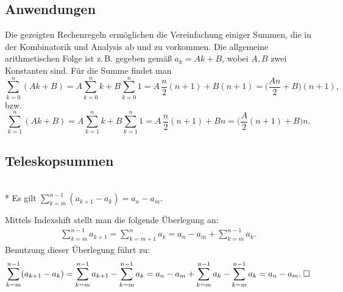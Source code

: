 \subsection{Anwendungen}

Die gezeigten Rechenregeln ermöglichen die Vereinfachung
einiger Summen, die in der Kombinatorik und Analysis ab
und zu vorkommen. Die allgemeine arithmetischen Folge ist z.\,B.
gegeben gemäß $a_k=Ak+B$, wobei $A,B$ zwei Konstanten sind.
Für die Summe findet man%
\[\sum_{k=0}^n (Ak+B)
= A\sum_{k=0}^n k+B\sum_{k=0}^n 1 = A\,\frac{n}{2}(n+1)+B(n+1)
= \Big(\frac{An}{2}+B\Big)(n+1),\]
bzw.
\[\sum_{k=1}^n (Ak+B)
= A\sum_{k=1}^n k + B\sum_{k=1}^n 1
= A\,\frac{n}{2}(n+1)+Bn = \Big(\frac{A}{2}(n+1)+B\Big)n.\]

\newpage
\subsection{Teleskopsummen}

\begin{Satz}[Teleskopsumme]\mbox{}\\*
Es gilt $\sum_{k=m}^{n-1} (a_{k+1}-a_k) = a_n-a_m$.
\end{Satz}
Mittels Indexshift stellt man die folgende Überlegung an:
\begin{gather*}
\sum_{k=m}^{n-1} a_{k+1}
= \sum_{k=m+1}^n a_k = a_n-a_m+\sum_{k=m}^{n-1} a_k.
\end{gather*}
Benutzung dieser Überlegung führt zu:
\begin{gather*}
\sum_{k=m}^{n-1} (a_{k+1}-a_k)
= \sum_{k=m}^{n-1} a_{k+1}-\sum_{k=m}^{n-1} a_k
= a_n-a_m+\sum_{k=m}^{n-1} a_k-\sum_{k=m}^{n-1} a_k
= a_n-a_m.\;\Box
\end{gather*}

